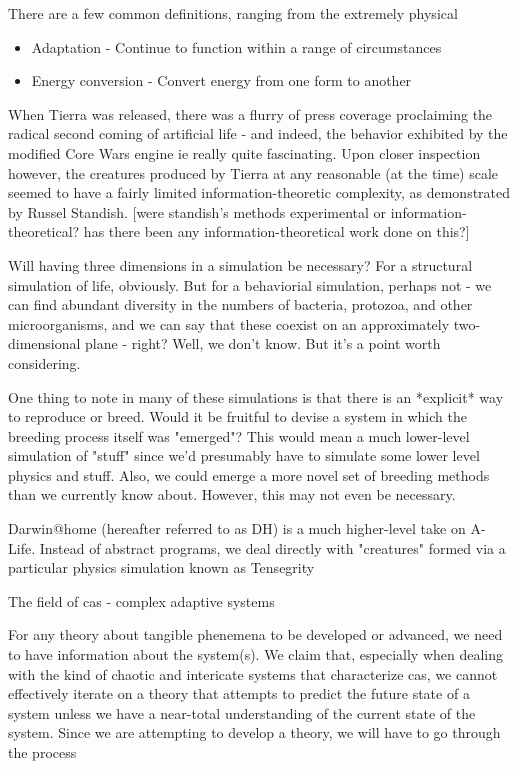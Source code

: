 \documentclass{article}
\begin{document}
There are a few common definitions, ranging from the extremely physical

\begin{itemize}
\item Adaptation - Continue to function within a range of circumstances
\item Energy conversion - Convert energy from one form to another
\end{itemize}
	
When Tierra was released, there was a flurry of press coverage proclaiming the radical second coming of artificial life - and indeed, the behavior exhibited by the modified Core Wars engine ie really quite fascinating. Upon closer inspection however, the creatures produced by Tierra at any reasonable (at the time) scale seemed to have a fairly limited information-theoretic complexity, as demonstrated by  Russel Standish. [were standish's methods experimental or information-theoretical? has there been any information-theoretical work done on this?]


Will having three dimensions in a simulation be necessary? For a structural simulation of life, obviously. But for a behaviorial simulation, perhaps not - we can find abundant diversity in the numbers of bacteria, protozoa, and other microorganisms, and we can say that these coexist on an approximately two-dimensional plane - right? Well, we don't know. But it's a point worth considering.

One thing to note in many of these simulations is that there is an *explicit* way to reproduce or breed. Would it be fruitful to devise a system in which the breeding process itself was "emerged"? This would mean a much lower-level simulation of "stuff" since we'd presumably have to simulate some lower level physics and stuff. Also, we could emerge a more novel set of breeding methods than we currently know about. However, this may not even be necessary.

Darwin@home (hereafter referred to as DH) is a much higher-level take on A-Life. Instead of abstract programs, we deal directly with "creatures" formed via a particular physics simulation known as Tensegrity






 The field of cas - complex adaptive systems


For any theory about tangible phenemena to be developed or advanced, we need to have information about the system(s). We claim that, especially when dealing with the kind of chaotic and intericate systems that characterize cas, we cannot effectively iterate on a theory that attempts to predict the future state of a system unless we have a near-total understanding of the current state of the system. Since we are attempting to develop a theory, we will have to go through the process
\end{document}
